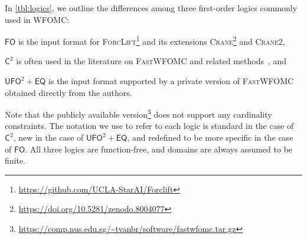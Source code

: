 \documentclass{article}
\theoremstyle{definition}
\theoremstyle{remark}
\newcommand{\cmark}{\ding{51}}
\newcommand{\xmark}{\ding{55}}
\newcommand{\Ctwo}{$\mathsf{C}^{2}$}
\newcommand{\FO}{$\mathsf{FO}$}
\newcommand{\UFO}{$\mathsf{UFO}^{2} + \mathsf{EQ}$}
\newcommand{\Cranetwo}{\textsc{Crane2}}
\begin{document}

In \cref{tbl:logics}, we outline the differences among three first-order logics
commonly used in WFOMC:
\begin{enumerate*}[label=(\roman*)]
  \item \FO{} is the input format for
  \textsc{ForcLift}\footnote{\url{https://github.com/UCLA-StarAI/Forclift}} and
  its extensions
  \textsc{Crane}\footnote{\url{https://doi.org/10.5281/zenodo.8004077}} and
  \Cranetwo{},
  \item \Ctwo{} is often used in the literature on \textsc{FastWFOMC} and
  related
  methods~\cite{DBLP:journals/jair/Kuzelka21,DBLP:conf/aaai/MalhotraS22}, and
  \item \UFO{} is the input format supported by a private version of
  \textsc{FastWFOMC} obtained directly from the authors.
\end{enumerate*}
Note that the publicly available
version\footnote{\url{https://comp.nus.edu.sg/~tvanbr/software/fastwfomc.tar.gz}}
does not support any cardinality constraints. The notation we use to refer to
each logic is standard in the case of \Ctwo{}, new in the case of \UFO{}, and
redefined to be more specific in the case of \FO{}. All three logics are
function-free, and domains are always assumed to be finite.
\end{document}
